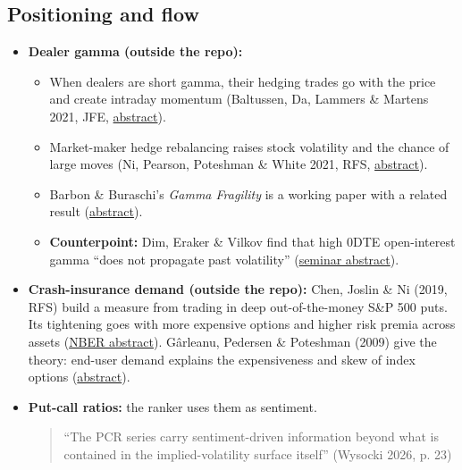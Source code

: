 \documentclass{article}
\begin{document}
\subsection{Positioning and flow}

\begin{itemize}

\item \textbf{Dealer gamma (outside the repo):}

\begin{itemize}

\item When dealers are short gamma, their hedging trades go with the price and create intraday momentum (Baltussen, Da, Lammers \& Martens 2021, JFE, \href{https://econpapers.repec.org/RePEc:eee:jfinec:v:142:y:2021:i:1:p:377-403}{abstract}).

\item Market-maker hedge rebalancing raises stock volatility and the chance of large moves (Ni, Pearson, Poteshman \& White 2021, RFS, \href{https://ideas.repec.org/a/oup/rfinst/v34y2021i4p1952-1986..html}{abstract}).

\item Barbon \& Buraschi's \emph{Gamma Fragility} is a working paper with a related result (\href{https://www.alexandria.unisg.ch/261487}{abstract}).

\item \textbf{Counterpoint:} Dim, Eraker \& Vilkov find that high 0DTE open-interest gamma ``does not propagate past volatility'' (\href{https://www.maths.ox.ac.uk/node/67396}{seminar abstract}).

\end{itemize}

\item \textbf{Crash-insurance demand (outside the repo):} Chen, Joslin \& Ni (2019, RFS) build a measure from trading in deep out-of-the-money S\&P 500 puts. Its tightening goes with more expensive options and higher risk premia across assets (\href{https://www.nber.org/papers/w25573}{NBER abstract}). Gârleanu, Pedersen \& Poteshman (2009) give the theory: end-user demand explains the expensiveness and skew of index options (\href{https://ideas.repec.org/a/oup/rfinst/v22y2009i10p4259-4299.html}{abstract}).

\item \textbf{Put-call ratios:} the ranker uses them as sentiment.

\begin{quote}``The PCR series carry sentiment-driven information beyond what is contained in the implied-volatility surface itself'' (Wysocki 2026, p. 23)\end{quote}

\end{itemize}
\end{document}
